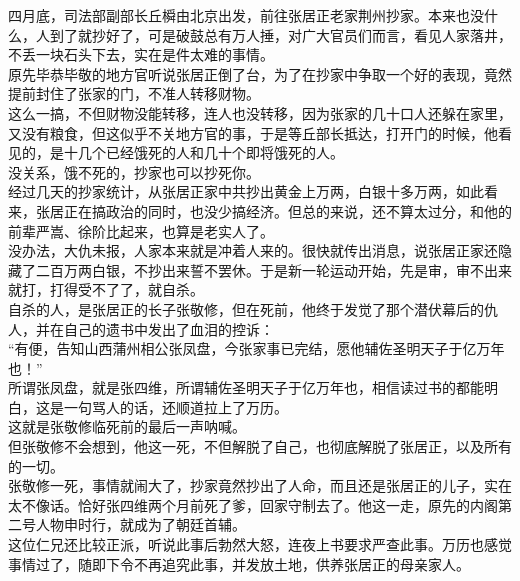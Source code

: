\begin{multicols}{\theparacolNo}
四月底，司法部副部长丘橓由北京出发，前往张居正老家荆州抄家。本来也没什么，人到了就抄好了，可是破鼓总有万人捶，对广大官员们而言，看见人家落井，不丢一块石头下去，实在是件太难的事情。\\

原先毕恭毕敬的地方官听说张居正倒了台，为了在抄家中争取一个好的表现，竟然提前封住了张家的门，不准人转移财物。\\

这么一搞，不但财物没能转移，连人也没转移，因为张家的几十口人还躲在家里，又没有粮食，但这似乎不关地方官的事，于是等丘部长抵达，打开门的时候，他看见的，是十几个已经饿死的人和几十个即将饿死的人。\\

没关系，饿不死的，抄家也可以抄死你。\\

经过几天的抄家统计，从张居正家中共抄出黄金上万两，白银十多万两，如此看来，张居正在搞政治的同时，也没少搞经济。但总的来说，还不算太过分，和他的前辈严嵩、徐阶比起来，也算是老实人了。\\

没办法，大仇未报，人家本来就是冲着人来的。很快就传出消息，说张居正家还隐藏了二百万两白银，不抄出来誓不罢休。于是新一轮运动开始，先是审，审不出来就打，打得受不了了，就自杀。\\

自杀的人，是张居正的长子张敬修，但在死前，他终于发觉了那个潜伏幕后的仇人，并在自己的遗书中发出了血泪的控诉：\\

“有便，告知山西蒲州相公张凤盘，今张家事已完结，愿他辅佐圣明天子于亿万年也！”\\

所谓张凤盘，就是张四维，所谓辅佐圣明天子于亿万年也，相信读过书的都能明白，这是一句骂人的话，还顺道拉上了万历。\\

这就是张敬修临死前的最后一声呐喊。\\

但张敬修不会想到，他这一死，不但解脱了自己，也彻底解脱了张居正，以及所有的一切。\\

张敬修一死，事情就闹大了，抄家竟然抄出了人命，而且还是张居正的儿子，实在太不像话。恰好张四维两个月前死了爹，回家守制去了。他这一走，原先的内阁第二号人物申时行，就成为了朝廷首辅。\\

这位仁兄还比较正派，听说此事后勃然大怒，连夜上书要求严查此事。万历也感觉事情过了，随即下令不再追究此事，并发放土地，供养张居正的母亲家人。\\


\end{multicols}

